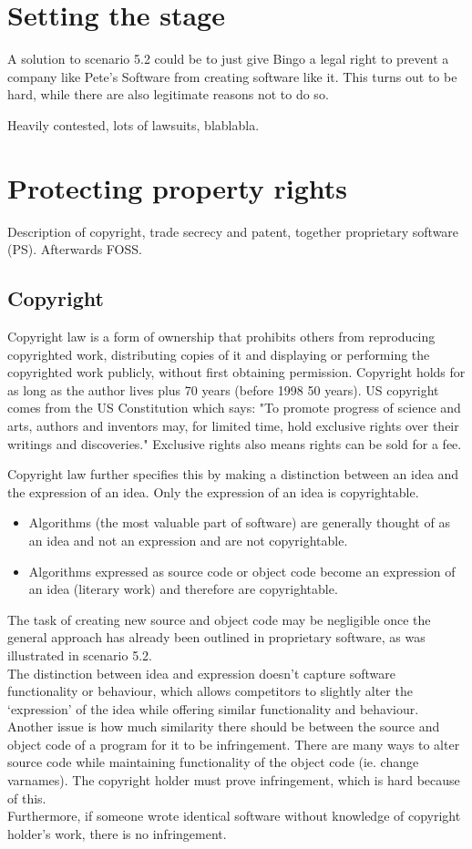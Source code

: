 \documentclass[a4paper]{article}
\begin{document}
\section*{Setting the stage}
A solution to scenario 5.2 could be to just give Bingo a legal right to
prevent a company like Pete's Software from creating software like it.
This turns out to be hard, while there are also legitimate reasons not to do so.

Heavily contested, lots of lawsuits, blablabla.

\section*{Protecting property rights}
Description of copyright, trade secrecy and patent,
together proprietary software (PS). Afterwards FOSS.

\subsection*{Copyright}
Copyright law is a form of ownership that prohibits others from reproducing
copyrighted work, distributing copies of it and displaying or performing
the copyrighted work publicly, without first obtaining permission.
Copyright holds for as long as the author lives plus 70 years (before 1998 50 years).
US copyright comes from the US Constitution which says:
"To promote progress of science and arts, authors and inventors may,
for limited time, hold exclusive rights over their writings and discoveries."
Exclusive rights also means rights can be sold for a fee.

Copyright law further specifies this by making a distinction between an idea
and the expression of an idea. Only the expression of an idea is copyrightable.
\begin{itemize}
\item Algorithms (the most valuable part of software) are generally
      thought of as an idea and not an expression and are not copyrightable.
\item Algorithms expressed as source code or object code become an
      expression of an idea (literary work) and therefore are copyrightable.
\end{itemize}
The task of creating new source and object code may be negligible once
the general approach has already been outlined in proprietary software,
as was illustrated in scenario 5.2. \\
The distinction between idea and expression doesn't capture software
functionality or behaviour, which allows competitors to slightly alter
the `expression' of the idea while offering similar functionality and behaviour. \\
Another issue is how much similarity there should be between the source and object
code of a program for it to be infringement. There are many ways to alter source
code while maintaining functionality of the object code (ie. change varnames).
The copyright holder must prove infringement, which is hard because of this. \\
Furthermore, if someone wrote identical software without knowledge of
copyright holder's work, there is no infringement. \\
\end{document}
